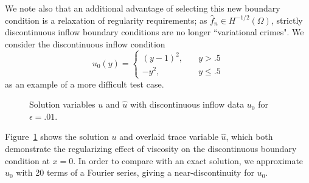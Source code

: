 \documentclass[11pt,onecolumn]{scrartcl}
\begin{document}
We note also that an additional advantage of selecting this new boundary condition is a relaxation of regularity requirements; as $\widehat{f}_n \in H^{-1/2}(\Omega)$, strictly discontinuous inflow boundary conditions are no longer ``variational crimes".  We consider the discontinuous inflow condition
\[
u_0(y) = \begin{cases}
(y-1)^2, \quad &y>.5\\
-y^2, \quad &y\leq .5 
\end{cases}
\]
as an example of a more difficult test case. 

\begin{figure}[h!]
\centering
{}
\caption{Solution variables $u$ and $\widehat{u}$ with discontinuous inflow data $u_0$ for $\epsilon = .01$.}
\label{disc_sol}
\end{figure}
Figure~\ref{disc_sol} shows the solution $u$ and overlaid trace variable $\widehat{u}$, which both demonstrate the regularizing effect of viscosity on the discontinuous boundary condition at $x=0$. In order to compare with an exact solution, we approximate $u_0$ with 20 terms of a Fourier series, giving a near-discontinuity for $u_0$.  
\end{document}
